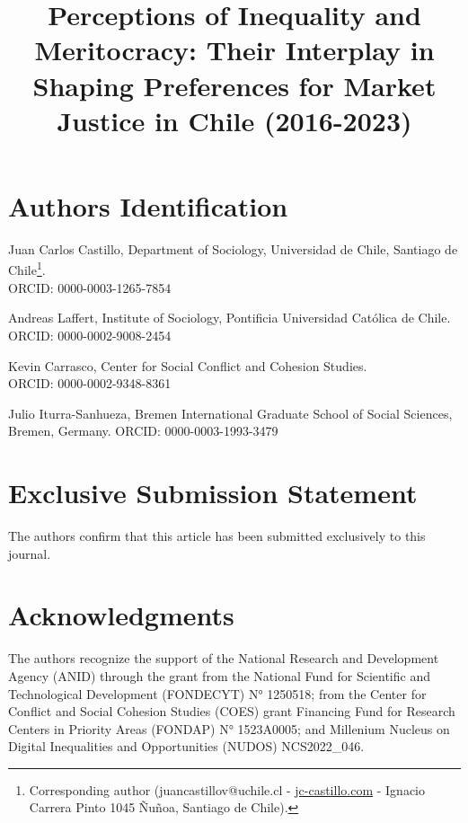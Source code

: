 \documentclass[
  12pt,
]{article}
\title{Perceptions of Inequality and Meritocracy: Their Interplay in
Shaping Preferences for Market Justice in Chile (2016-2023)}
\date{}
\begin{document}
\maketitle
\ifdefined\Shaded\renewenvironment{Shaded}{\begin{tcolorbox}[borderline west={3pt}{0pt}{shadecolor}, interior hidden, sharp corners, breakable, enhanced, frame hidden, boxrule=0pt]}{\end{tcolorbox}}\fi

\hypertarget{authors-identification}{%
\section{Authors Identification}\label{authors-identification}}

Juan Carlos Castillo, Department of Sociology, Universidad de Chile,
Santiago de Chile\footnote{Corresponding author (juancastillov@uchile.cl
  -
  \href{https://juancarloscastillo.github.io/jc-castillo/}{jc-castillo.com}
  - Ignacio Carrera Pinto 1045 Ñuñoa, Santiago de Chile).}.\\
ORCID: 0000-0003-1265-7854

Andreas Laffert, Institute of Sociology, Pontificia Universidad Católica
de Chile.\\
ORCID: 0000-0002-9008-2454

Kevin Carrasco, Center for Social Conflict and Cohesion Studies.\\
ORCID: 0000-0002-9348-8361

Julio Iturra-Sanhueza, Bremen International Graduate School of Social
Sciences, Bremen, Germany. ORCID: 0000-0003-1993-3479

\hypertarget{exclusive-submission-statement}{%
\section{Exclusive Submission
Statement}\label{exclusive-submission-statement}}

The authors confirm that this article has been submitted exclusively to
this journal.

\hypertarget{acknowledgments}{%
\section{Acknowledgments}\label{acknowledgments}}

The authors recognize the support of the National Research and
Development Agency (ANID) through the grant from the National Fund for
Scientific and Technological Development (FONDECYT) N° 1250518; from the
Center for Conflict and Social Cohesion Studies (COES) grant Financing
Fund for Research Centers in Priority Areas (FONDAP) N° 1523A0005; and
Millenium Nucleus on Digital Inequalities and Opportunities (NUDOS)
NCS2022\_046.
\end{document}
